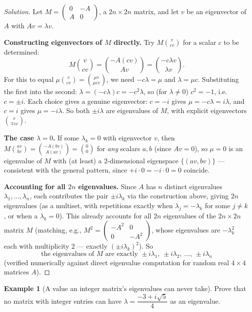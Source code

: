 \documentclass[11pt]{article}
\theoremstyle{definition}
\newtheorem{example}{Example}[section]
\begin{document}
\begin{proof}[Solution]
Let $M=\begin{pmatrix}0&-A\\A&0\end{pmatrix}$, a $2n\times2n$ matrix, and let $v$ be an eigenvector of $A$ with $Av=\lambda v$.

\textbf{Constructing eigenvectors of $M$ directly.} Try $M\binom{v}{cv}$ for a scalar $c$ to be determined:
\[
M\binom{v}{cv}=\binom{-A(cv)}{Av}=\binom{-c\lambda v}{\lambda v}.
\]
For this to equal $\mu\binom{v}{cv}=\binom{\mu v}{\mu cv}$, we need $-c\lambda=\mu$ and $\lambda=\mu c$. Substituting the first into the second: $\lambda=(-c\lambda)c=-c^2\lambda$, so (for $\lambda\ne0$) $c^2=-1$, i.e.\ $c=\pm i$. Each choice gives a genuine eigenvector: $c=-i$ gives $\mu=-c\lambda=i\lambda$, and $c=i$ gives $\mu=-i\lambda$. So both $\pm i\lambda$ are eigenvalues of $M$, with explicit eigenvectors $\binom{v}{\mp iv}$.

\textbf{The case $\lambda=0$.} If some $\lambda_k=0$ with eigenvector $v$, then $M\binom{av}{bv}=\binom{-A(bv)}{A(av)}=\binom00$ for \emph{any} scalars $a,b$ (since $Av=0$), so $\mu=0$ is an eigenvalue of $M$ with (at least) a $2$-dimensional eigenspace $\{(av,bv)\}$ — consistent with the general pattern, since $+i\cdot0=-i\cdot0=0$ coincide.

\textbf{Accounting for all $2n$ eigenvalues.} Since $A$ has $n$ distinct eigenvalues $\lambda_1,\dots,\lambda_n$, each contributes the pair $\pm i\lambda_k$ via the construction above, giving $2n$ eigenvalues (as a multiset, with repetitions exactly when $\lambda_j=-\lambda_k$ for some $j\ne k$, or when a $\lambda_k=0$). This already accounts for all $2n$ eigenvalues of the $2n\times2n$ matrix $M$ (matching, e.g., $M^2=\begin{pmatrix}-A^2&0\\0&-A^2\end{pmatrix}$, whose eigenvalues are $-\lambda_k^2$ each with multiplicity $2$ — exactly $(\pm i\lambda_k)^2$). So
\[
\boxed{\text{the eigenvalues of } M \text{ are exactly } \pm i\lambda_1,\ \pm i\lambda_2,\ \dots,\ \pm i\lambda_n}
\]
(verified numerically against direct eigenvalue computation for random real $4\times4$ matrices $A$).
\end{proof}

\begin{example}[A value an integer matrix's eigenvalues can never take]
Prove that no matrix with integer entries can have $\lambda=\dfrac{-3+i\sqrt5}4$ as an eigenvalue.
\end{example}
\end{document}
